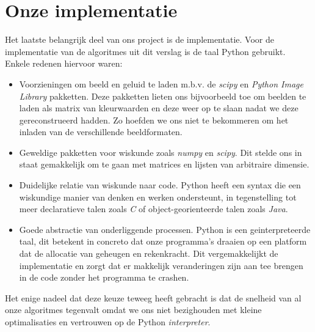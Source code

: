 \documentclass[11pt]{uvamath}
\theoremstyle{plain}
\theoremstyle{definition}
\theoremstyle{remark}
\begin{document}
\section*{Onze implementatie}
Het laatste belangrijk deel van ons project is de implementatie. Voor de implementatie van de algoritmes uit dit verslag is de taal Python gebruikt.
Enkele redenen hiervoor waren:
\begin{itemize}
\item Voorzieningen om beeld en geluid te laden m.b.v. de \emph{scipy}\cite{scipy} en \emph{Python Image Library}\cite{pil} pakketten.
  Deze pakketten lieten ons bijvoorbeeld toe om beelden te laden als matrix van kleurwaarden en deze weer op te slaan
  nadat we deze gereconstrueerd hadden. Zo hoefden we ons niet te bekommeren om het inladen van de verschillende beeldformaten.
\item Geweldige pakketten voor wiskunde zoals \emph{numpy}\cite{numpy} en \emph{scipy}. Dit stelde ons in staat gemakkelijk om te gaan met matrices en lijsten van arbitraire dimensie.
\item Duidelijke relatie van wiskunde naar code. Python heeft een syntax die een wiskundige manier van denken en werken
  ondersteunt, in tegenstelling tot meer declaratieve talen zoals \emph{C} of object-georienteerde talen zoals \emph{Java}.
\item Goede abstractie van onderliggende processen. Python is een geinterpreteerde taal, dit betekent in concreto
  dat onze programma's draaien op een platform dat de allocatie van geheugen en rekenkracht. Dit vergemakkelijkt
  de implementatie en zorgt dat er makkelijk veranderingen zijn aan tee brengen in de code zonder het programma te crashen.
\end{itemize}
Het enige nadeel dat deze keuze teweeg heeft gebracht is dat de snelheid van al onze algoritmes tegenvalt
omdat we ons niet bezighouden met kleine optimalisaties en vertrouwen op de Python \emph{interpreter}.














\end{document}
